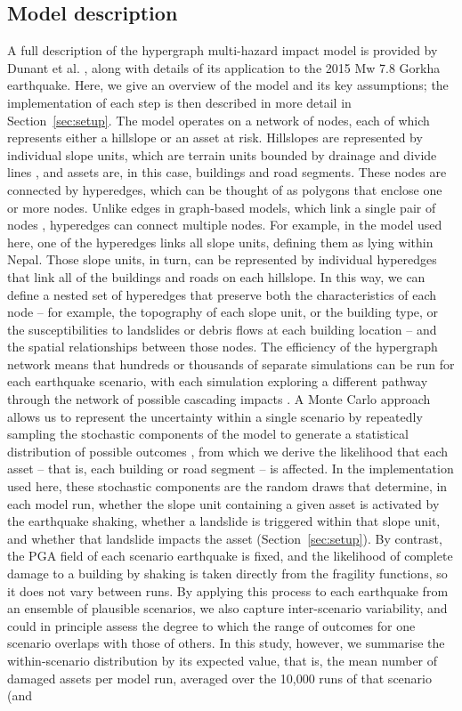 \documentclass[preprint,12pt,authoryear]{elsarticle}
\begin{document}
\subsection{Model description}
\label{sec:model}

A full description of the hypergraph multi-hazard impact model is provided by Dunant et al. \citep{Dunant2025}, along with details of its application to the 2015 Mw 7.8 Gorkha earthquake. Here, we give an overview of the model and its key assumptions; the implementation of each step is then described in more detail in Section~\ref{sec:setup}. The model operates on a network of nodes, each of which represents either a hillslope or an asset at risk. Hillslopes are represented by individual slope units, which are terrain units bounded by drainage and divide lines \citep{Alvioli2016}, and assets are, in this case, buildings and road segments. These nodes are connected by hyperedges, which can be thought of as polygons that enclose one or more nodes. Unlike edges in graph-based models, which link a single pair of nodes \citep{Dunant2021}, hyperedges can connect multiple nodes. For example, in the model used here, one of the hyperedges links all slope units, defining them as lying within Nepal. Those slope units, in turn, can be represented by individual hyperedges that link all of the buildings and roads on each hillslope. In this way, we can define a nested set of hyperedges that preserve both the characteristics of each node -- for example, the topography of each slope unit, or the building type, or the susceptibilities to landslides or debris flows at each building location -- and the spatial relationships between those nodes. The efficiency of the hypergraph network means that hundreds or thousands of separate simulations can be run for each earthquake scenario, with each simulation exploring a different pathway through the network of possible cascading impacts \citep{Dunant2025}. A Monte Carlo approach allows us to represent the uncertainty within a single scenario by repeatedly sampling the stochastic components of the model to generate a statistical distribution of possible outcomes \citep{dunant2021multihazards}, from which we derive the likelihood that each asset -- that is, each building or road segment -- is affected. In the implementation used here, these stochastic components are the random draws that determine, in each model run, whether the slope unit containing a given asset is activated by the earthquake shaking, whether a landslide is triggered within that slope unit, and whether that landslide impacts the asset (Section~\ref{sec:setup}). By contrast, the PGA field of each scenario earthquake is fixed, and the likelihood of complete damage to a building by shaking is taken directly from the fragility functions, so it does not vary between runs. By applying this process to each earthquake from an ensemble of plausible scenarios, we also capture inter-scenario variability, and could in principle assess the degree to which the range of outcomes for one scenario overlaps with those of others. In this study, however, we summarise the within-scenario distribution by its expected value, that is, the mean number of damaged assets per model run, averaged over the 10,000 runs of that scenario (and 
\end{document}
